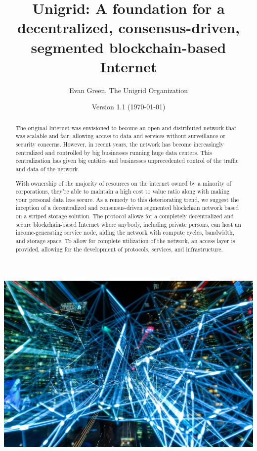 \documentclass[12pt]{article}
\author{Evan Green, The Unigrid Organization}
\title{Unigrid: A foundation for a decentralized, consensus-driven, segmented blockchain-based Internet}
\date{Version 1.1 (\today)}
\begin{document}
\maketitle


\newpage
\thispagestyle{fancy}

\begin{abstract}
The original Internet was envisioned to become an open and distributed network that was scalable and fair, allowing access to data and services without surveillance or security concerns. However, in recent years, the network has become increasingly centralized and controlled by big businesses running huge data centers. This centralization has given big entities and businesses unprecedented control of the traffic and data of the network.

With ownership of the majority of resources on the internet owned by a minority of corporations, they're able to maintain a high cost to value ratio along with making your personal data less secure. As a remedy to this deteriorating trend, we suggest the inception of a decentralized and consensus-driven segmented blockchain network based on a striped storage solution. The protocol allows for a completely decentralized and secure blockchain-based Internet where anybody, including private persons, can host an income-generating service node, aiding the network with compute cycles, bandwidth, and storage space. To allow for complete utilization of the network, an access layer is provided, allowing for the development of protocols, services, and infrastructure.

\end{abstract}

\includegraphics[scale=0.12]{lights}
\end{document}
